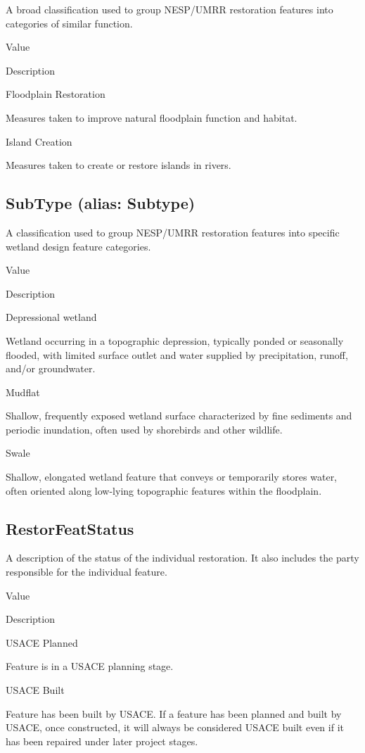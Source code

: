 \documentclass[
  letterpaper,
  DIV=11,
  numbers=noendperiod]{scrreprt}
\begin{document}
A broad classification used to group NESP/UMRR restoration features into
categories of similar function.

Value

Description

Floodplain Restoration

Measures taken to improve natural floodplain function and habitat.

Island Creation

Measures taken to create or restore islands in rivers.

\subsection{SubType (alias: Subtype)}\label{subtype-alias-subtype-16}

A classification used to group NESP/UMRR restoration features into
specific wetland design feature categories.

Value

Description

Depressional wetland

Wetland occurring in a topographic depression, typically ponded or
seasonally flooded, with limited surface outlet and water supplied by
precipitation, runoff, and/or groundwater.

Mudflat

Shallow, frequently exposed wetland surface characterized by fine
sediments and periodic inundation, often used by shorebirds and other
wildlife.

Swale

Shallow, elongated wetland feature that conveys or temporarily stores
water, often oriented along low-lying topographic features within the
floodplain.

\subsection{RestorFeatStatus}\label{restorfeatstatus-16}

A description of the status of the individual restoration. It also
includes the party responsible for the individual feature.

Value

Description

USACE Planned

Feature is in a USACE planning stage.

USACE Built

Feature has been built by USACE. If a feature has been planned and built
by USACE, once constructed, it will always be considered USACE built
even if it has been repaired under later project stages.
\end{document}
